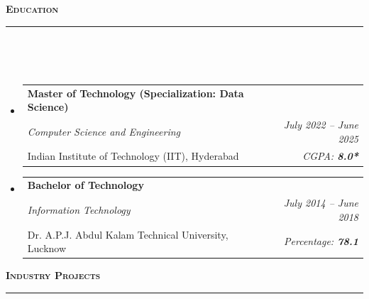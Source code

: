 \documentclass[a4paper,10pt]{article}
\makeatletter
\newcommand{\lsep}{-0.5cm}
\newcommand{\resheading}[1]{{\small
        {
            \begin{minipage}
                {0.992\textwidth}\textbf{{\textsc{#1 \vphantom{p\^{E}} }}}
                \\[-0.3cm]
                \hrule
            \end{minipage}
            \\[-0.5cm]
        }
 }}
\newcommand{\resEduHeading}[6]{
  \begin{tabular*}{7.1in}{l @{\extracolsep{\fill}} r}
    \textbf{\normalsize #1} \\
    \textit{#2} & \textit{#3} \\
    {\normalsize #4} & \textit{{#5} \textbf{#6}}
  \end{tabular*}
}
\makeatother
\begin{document}
\vspace{4pt}
\noindent
\resheading{\textbf{\large Education}}\\[\lsep]
\vspace{8pt}
\begin{itemize}
    \item \resEduHeading{Master of Technology (Specialization: Data Science)}
    {Computer Science and Engineering}
    {July 2022 -- June 2025}
    {Indian Institute of Technology (IIT), Hyderabad}
    {CGPA:}
    {8.0*}
    \item \resEduHeading{Bachelor of Technology}
    {Information Technology}
    {July 2014 -- June 2018}
    {Dr. A.P.J. Abdul Kalam Technical University, Lucknow}
    {Percentage:}
    {78.1}
\end{itemize}
\vspace{4pt}
\noindent
\resheading{\textbf{\large Industry Projects}}\\[\lsep] 
\end{document}
